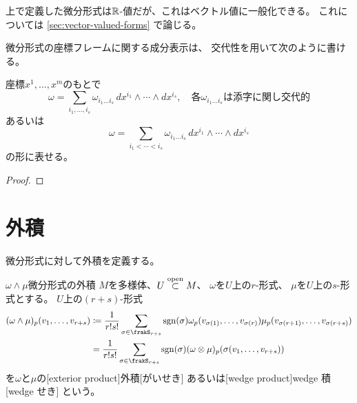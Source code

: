 \documentclass[report]{jlreq}
\begin{document}
\begin{remark}
    上で定義した微分形式は$\mathbb{R}$-値だが、これはベクトル値に一般化できる。
    これについては \cref{sec:vector-valued-forms} で論じる。
\end{remark}

微分形式の座標フレームに関する成分表示は、
交代性を用いて次のように書ける。

\begin{proposition}[微分形式の座標フレームに関する成分表示]
    座標$x^1, \dots, x^m$のもとで
    \begin{equation}
        \omega = \sum_{i_1, \dots, i_s}
            \omega_{i_1 \dots i_s} \,
            dx^{i_1} \wedge \cdots \wedge dx^{i_s},
            \quad
            \text{各$\omega_{i_1 \dots i_s}$は添字に関し交代的}
    \end{equation}
    あるいは
    \begin{equation}
        \omega = \sum_{i_1 < \cdots < i_s}
            \omega_{i_1 \dots i_s} \,
            dx^{i_1} \wedge \cdots \wedge dx^{i_s}
    \end{equation}
    の形に表せる。
    \TODO{}
\end{proposition}

\begin{proof}
    \TODO{}
\end{proof}

%
\section{外積}

微分形式に対して外積を定義する。

\begin{definition}[微分形式の外積]
        {$\omega \wedge \mu$}{微分形式の外積}
    $M$を多様体、$U \stackrel{\text{open}}{\subset} M$、
    $\omega$を$U$上の$r$-形式、
    $\mu$を$U$上の$s$-形式とする。
    $U$上の$(r + s)$-形式
    \begin{alignat}{1}
        (\omega \wedge \mu)_p (v_1, \dots, v_{r + s})
            &\coloneqq \frac{1}{r! s!}
            \sum_{\sigma \in \frakS_{r + s}}
            \sgn(\sigma)
            \omega_p(v_{\sigma(1)}, \dots, v_{\sigma(r)})
            \mu_p(v_{\sigma(r + 1)}, \dots, v_{\sigma(r + s)}) \\
            &= \frac{1}{r! s!}
            \sum_{\sigma \in \frakS_{r + s}}
            \sgn(\sigma)
            (\omega \otimes \mu)_p
            (\sigma(v_1, \dots, v_{r + s}))
    \end{alignat}
    を$\omega$と$\mu$の[exterior product]{外積}[がいせき]
    あるいは[wedge product]{wedge 積}[wedge せき]
    という。
\end{definition}
\end{document}
